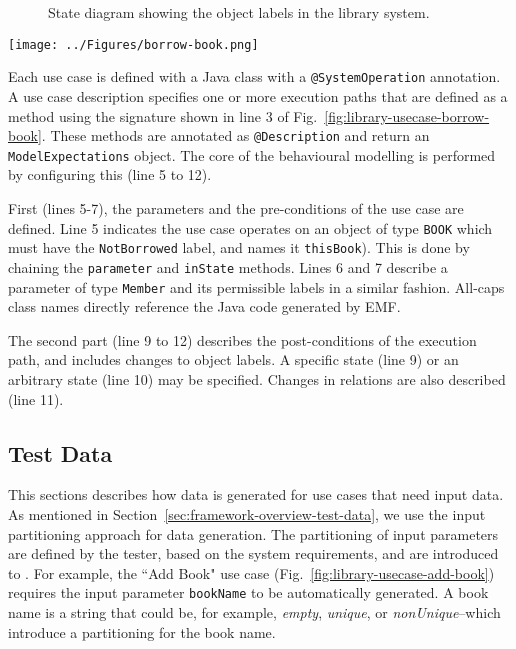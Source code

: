 \begin{figure}[h]
\centering
{}
\hfil
{}
\caption{State diagram showing the object labels in the library system.}
\label{fig:library-object-labels}
\end{figure} 

\begin{figure*}[h]
\centering
\texttt{[image: ../Figures/borrow-book.png]}
\caption{The behavioural modelling for ``Borrow Book" use case using our DSL.}
\label{fig:library-usecase-borrow-book}
\end{figure*}

Each use case is defined with a Java class with a \texttt{@SystemOperation} annotation. A use case description specifies one or more execution paths that are defined as a method using the signature shown in line 3 of Fig.~\ref{fig:library-usecase-borrow-book}. These methods are annotated as \texttt{@Description} and return an \texttt{ModelExpectations} object. The core of the behavioural modelling is performed by configuring this (line 5 to 12). 

First (lines 5-7), the parameters and the pre-conditions of the use case are defined. 
Line 5 indicates the use case operates on an object of type \texttt{BOOK} which must have the \texttt{NotBorrowed} label, and names it \texttt{thisBook}). This is done by chaining the \texttt{parameter} and \texttt{inState} methods. Lines 6 and 7 describe a parameter of type \texttt{Member} and its permissible labels in a similar fashion. All-caps class names directly reference the Java code generated by EMF. 

The second part (line 9 to 12) describes the post-conditions of the execution path, and includes changes to object labels.
A specific state (line 9) or an arbitrary state (line 10) may be specified. Changes in relations are also described (line 11). 

\subsection{Test Data}
\label{sec:create-test model-data}
This sections describes how data is generated for use cases that need input data. As mentioned in Section~\ref{sec:framework-overview-test-data}, we use the input partitioning approach for data generation. The partitioning of input parameters are defined by the tester, based on the system requirements, and are introduced to \this. For example, the ``Add Book" use case (Fig.~\ref{fig:library-usecase-add-book}) requires the input parameter \texttt{bookName} to be automatically generated. A book name is a string that could be, for example, \textit{empty}, \textit{unique}, or \textit{nonUnique}--which introduce a partitioning for the book name.

